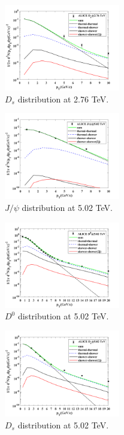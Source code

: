 \documentclass[twocolumn,aps,superscriptaddress,nofootinbib,floatfix]{revtex4}
\begin{document}
\begin{figure}[H]
	\includegraphics[width=0.45\textwidth]{Ds_276.png}
	\caption{$D_s$ distribution at 2.76 TeV. }
	\label{fig98}
\end{figure}
\begin{figure}[H]
	\includegraphics[width=0.45\textwidth]{Jpsi_502.png}
	\caption{$J/\psi$ distribution at 5.02 TeV. }
	\label{fig99}
\end{figure}
\begin{figure}[H]
	\includegraphics[width=0.45\textwidth]{D0_502.png}
	\caption{$D^0$ distribution at 5.02 TeV. }
	\label{fig100}
\end{figure}

\begin{figure}[H]
	\includegraphics[width=0.45\textwidth]{Ds_502.png}
	\caption{$D_s$ distribution at 5.02 TeV. }
	\label{fig101}
\end{figure}
\end{document}
